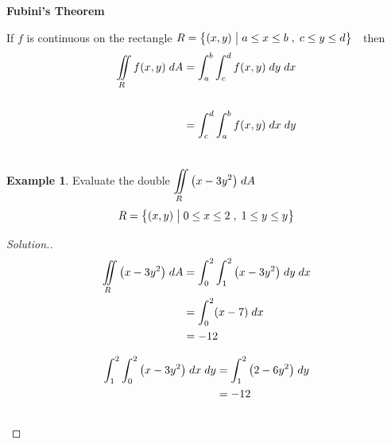 \documentclass[11pt,a4paper]{article}
\theoremstyle{definition}
\newtheorem{exa}[thm]{Example}
\newenvironment{solution}
  {\renewcommand{\qedsymbol}{}\begin{proof}[\textit{Solution}.]}
  {\end{proof}}
\newcommand{\subhead}[1]{%
  \par\medskip\noindent\textbf{#1}\par\nobreak\smallskip}
\begin{document}
\subhead{Fubini's Theorem}


If $f$ is continuous on the rectangle \hspace{0.2cm}$R = \big\{ (x,y)\hspace{0.1cm} \big|\hspace{0.1cm} a\leq x \leq b\hspace{0.1cm} , \hspace{0.1cm} c\leq y\leq d\big\}\hspace{0.2cm}$ then 
\begin{align*}
\iint\limits_R f(x,y)\hspace{0.1cm} dA & = \int^b_a \int^d_c f(x,y)\hspace{0.1cm}dy\hspace{0.1cm} dx\\\\
& = \int^d_c \int^b_a f(x,y)\hspace{0.1cm}dx\hspace{0.1cm} dy\\\\
\end{align*}

\begin{exa}


Evaluate the double $\displaystyle{\iint\limits_R \big(x-3y^2\big)\hspace{0.1cm}dA}$ $$R = \big\{ (x,y)\hspace{0.1cm} \big|\hspace{0.1cm} 0\leq x \leq 2\hspace{0.1cm} , \hspace{0.1cm} 1 \leq y \leq y \big\}$$
\end{exa}


\begin{solution}
\begin{align*}
\iint\limits_R \big(x-3y^2\big)\hspace{0.1cm}dA & = \int^2_0\int^2_1 \big(x-3y^2\big)\hspace{0.1cm} dy \hspace{0.1cm} dx\\
& = \int^2_0 (x - 7)\hspace{0.1cm}dx\\
& = -12\\
\end{align*}

\begin{align*}
\int^2_1\int^2_0 \big(x-3y^2\big)\hspace{0.1cm} dx \hspace{0.1cm} dy & = \int^2_1 \big(2 - 6y^2\big)\hspace{0.1cm} dy\\
& = -12\\\\
\end{align*}
\end{solution}
\end{document}
